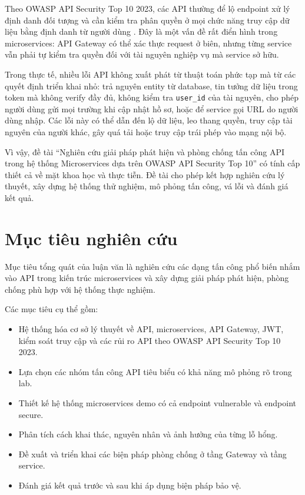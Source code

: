 \documentclass[14pt,a4paper]{extreport}
\begin{document}
Theo OWASP API Security Top 10 2023, các API thường để lộ endpoint xử lý định danh đối tượng và cần kiểm tra phân quyền ở mọi chức năng truy cập dữ liệu bằng định danh từ người dùng \cite{owaspbola}. Đây là một vấn đề rất điển hình trong microservices: API Gateway có thể xác thực request ở biên, nhưng từng service vẫn phải tự kiểm tra quyền đối với tài nguyên nghiệp vụ mà service sở hữu.

Trong thực tế, nhiều lỗi API không xuất phát từ thuật toán phức tạp mà từ các quyết định triển khai nhỏ: trả nguyên entity từ database, tin tưởng dữ liệu trong token mà không verify đầy đủ, không kiểm tra \texttt{user\_id} của tài nguyên, cho phép người dùng gửi mọi trường khi cập nhật hồ sơ, hoặc để service gọi URL do người dùng nhập. Các lỗi này có thể dẫn đến lộ dữ liệu, leo thang quyền, truy cập tài nguyên của người khác, gây quá tải hoặc truy cập trái phép vào mạng nội bộ.

Vì vậy, đề tài ``Nghiên cứu giải pháp phát hiện và phòng chống tấn công API trong hệ thống Microservices dựa trên OWASP API Security Top 10'' có tính cấp thiết cả về mặt khoa học và thực tiễn. Đề tài cho phép kết hợp nghiên cứu lý thuyết, xây dựng hệ thống thử nghiệm, mô phỏng tấn công, vá lỗi và đánh giá kết quả.

\section{Mục tiêu nghiên cứu}
Mục tiêu tổng quát của luận văn là nghiên cứu các dạng tấn công phổ biến nhắm vào API trong kiến trúc microservices và xây dựng giải pháp phát hiện, phòng chống phù hợp với hệ thống thực nghiệm.

Các mục tiêu cụ thể gồm:
\begin{itemize}
  \item Hệ thống hóa cơ sở lý thuyết về API, microservices, API Gateway, JWT, kiểm soát truy cập và các rủi ro API theo OWASP API Security Top 10 2023.
  \item Lựa chọn các nhóm tấn công API tiêu biểu có khả năng mô phỏng rõ trong lab.
  \item Thiết kế hệ thống microservices demo có cả endpoint vulnerable và endpoint secure.
  \item Phân tích cách khai thác, nguyên nhân và ảnh hưởng của từng lỗ hổng.
  \item Đề xuất và triển khai các biện pháp phòng chống ở tầng Gateway và tầng service.
  \item Đánh giá kết quả trước và sau khi áp dụng biện pháp bảo vệ.
\end{itemize}
\end{document}
